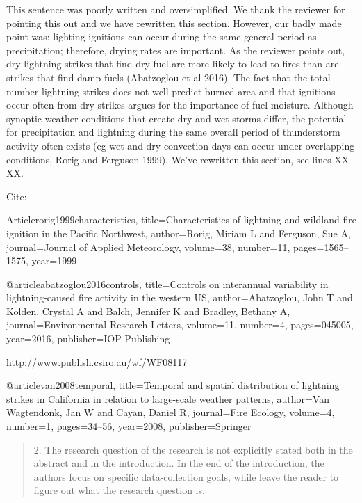 \documentclass[letterpaper, 12pt]{letter}
\begin{document}
\begin{letter}{}
This sentence was poorly written and oversimplified. We thank the reviewer for
pointing this out and we have rewritten this section. However, our badly made
point was: lighting ignitions can occur during the same general period as
precipitation; therefore, drying rates are important. As the reviewer points
out, dry lightning strikes that find dry fuel are more likely to lead to fires
than are strikes that find damp fuels (Abatzoglou et al 2016). The fact that
the total number lightning strikes does not well predict burned area and that
ignitions occur often from dry strikes argues for the importance of fuel
moisture. Although synoptic weather conditions that create dry and wet storms
differ, the potential for precipitation and lightning during the same overall
period of thunderstorm activity often exists (eg wet and dry convection days
can occur under overlapping conditions, Rorig and Ferguson 1999). We've
rewritten this section, see lines XX-XX.


Cite:

Article{rorig1999characteristics,
  title={Characteristics of lightning and wildland fire ignition in the Pacific Northwest},
  author={Rorig, Miriam L and Ferguson, Sue A},
  journal={Journal of Applied Meteorology},
  volume={38},
  number={11},
  pages={1565--1575},
  year={1999}
}


@article{abatzoglou2016controls,
  title={Controls on interannual variability in lightning-caused fire activity in the western US},
  author={Abatzoglou, John T and Kolden, Crystal A and Balch, Jennifer K and Bradley, Bethany A},
  journal={Environmental Research Letters},
  volume={11},
  number={4},
  pages={045005},
  year={2016},
  publisher={IOP Publishing}
}

http://www.publish.csiro.au/wf/WF08117

@article{van2008temporal,
  title={Temporal and spatial distribution of lightning strikes in California in relation to large-scale weather patterns},
  author={Van Wagtendonk, Jan W and Cayan, Daniel R},
  journal={Fire Ecology},
  volume={4},
  number={1},
  pages={34--56},
  year={2008},
  publisher={Springer}
}



\begin{quote}
2. The research question of the research is not explicitly stated both in the abstract and in the introduction. In the end of the introduction, the authors focus on specific data-collection goals, while leave the reader to figure out what the research question is. 
\end{quote}


\end{letter}
\end{document}
